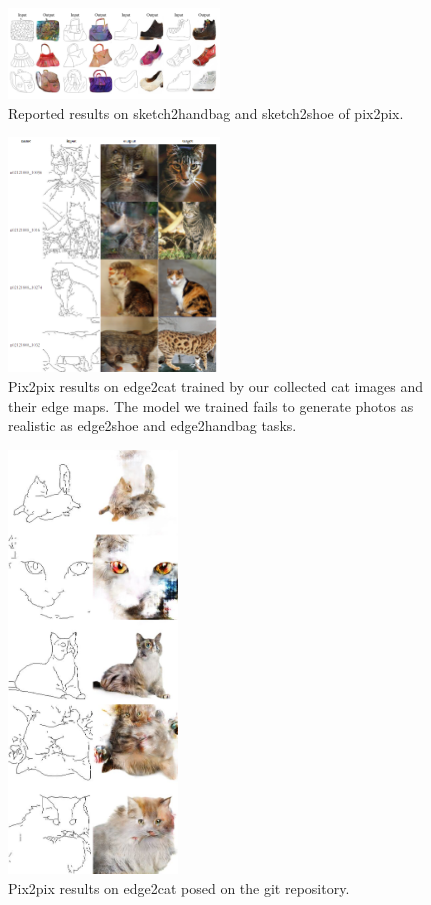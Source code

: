 \begin{figure}
	\includegraphics[width=0.5\textwidth]{figures/pix2pix/reported_sketch2handbag}
	\caption{\label{pix2pix_sketch2shoeNhandbag}Reported results on sketch2handbag and sketch2shoe of pix2pix.}
\end{figure}

\begin{figure}
	\includegraphics[width=0.5\textwidth]{figures/pix2pix/edge2cat}
	\caption{\label{pix2pix_edge2cat}Pix2pix results on edge2cat trained by our collected cat images and their edge maps. The model we trained fails to generate photos as realistic as edge2shoe and edge2handbag tasks. }
\end{figure}

\begin{figure}
	\includegraphics[width=0.4\textwidth]{figures/pix2pix/edges2cats-sheet}
	\caption{\label{pix2pix_reported_edge2cat}Pix2pix results on edge2cat posed on the git repository.}
\end{figure}


